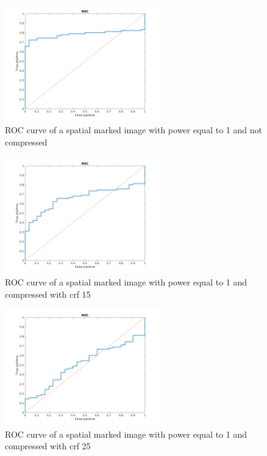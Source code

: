 \begin{figure}[h!]
\centering
\includegraphics[width=0.6\textwidth]{./img/ROC/ROC_gauss_1_1.png}
\caption{\small{ROC curve of a spatial marked image with power equal to 1 and not compressed}}
\label{fig:g1crf1}
\end{figure}
\begin{figure}[h!]
\centering
\includegraphics[width=0.6\textwidth]{./img/ROC/ROC_gauss_1_15.png}
\caption{\small{ROC curve of a spatial marked image with power equal to 1 and compressed with crf 15}}
\label{fig:g1crf15}
\end{figure}
\begin{figure}[h!]
\centering
\includegraphics[width=0.6\textwidth]{./img/ROC/ROC_gauss_1_25.png}
\caption{\small{ROC curve of a spatial marked image with power equal to 1 and compressed with crf 25}}
\label{fig:g1crf25}
\end{figure}
